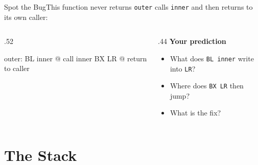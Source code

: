\documentclass[9pt,aspectratio=169,xcolor=table]{beamer}
\begin{document}
{\beamerextras
\begin{frame}[fragile]{Spot the Bug}{This function never returns}
    \leavevmode
    \texttt{outer} calls \texttt{inner} and then returns to its own caller:

    \vspace{2mm}
    \begin{columns}[T]
    \begin{column}{.52\textwidth}
\begin{asm}[basicstyle=\ttfamily\small]
outer:
    BL    inner   @ call inner
    BX    LR      @ return to caller
\end{asm}
    \end{column}
    \begin{column}{.44\textwidth}
        \textbf{Your prediction}
        {\small
        \begin{itemize}\itemsep2pt
            \item What does \texttt{BL inner} write into \texttt{LR}?
            \item Where does \texttt{BX LR} then jump?
            \item What is the fix?
        \end{itemize}}
    \end{column}
    \end{columns}

    \vspace{2mm}
\end{frame}
}


\section{The Stack}
\end{document}
